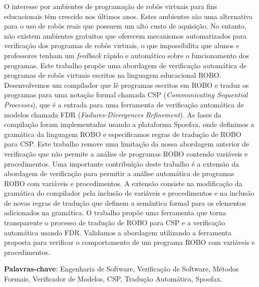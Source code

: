 \setlength{\absparsep}{18pt} %
\begin{resumo}
 
O interesse por ambientes de programação de robôs virtuais para fins educacionais têm crescido nos últimos anos. Estes ambientes são uma alternativa para o uso de robôs reais que possuem um alto custo de aquisição. No entanto, não existem ambientes gratuitos que oferecem  mecanismos automatizados para verificação dos programas de robôs virtuais, o que impossibilita que alunos e professores tenham um \textit{feedback} rápido e automático sobre o funcionamento dos programas. 
Este trabalho propõe uma abordagem de verificação automática de programas de robôs virtuais escritos na linguagem educacional ROBO. Desenvolvemos um compilador que lê programas escritos em ROBO e traduz os programas para uma notação formal chamada CSP (\textit{Communicating Sequential Processes}), que é a entrada para uma ferramenta de verificação automática de modelos chamada FDR (\textit{Failures-Divergences Refinement}). As fases da compilação foram implementadas usando a plataforma Spoofax, onde definimos a gramática da linguagem ROBO e especificamos regras de tradução de ROBO para CSP.  
Este trabalho remove uma limitação da nossa abordagem anterior de verificação que não permite a análise de programas ROBO contendo variáveis e procedimentos.
Uma importante contribuição deste trabalho é a extensão da abordagem de verificação para permitir a análise automática de programas ROBO com variáveis e procedimentos. 
A extensão consiste na modificação da gramática do compilador pela inclusão de variáveis e procedimentos e na inclusão de novas regras de tradução que definem a semântica formal para os elementos adicionados na gramática.
O trabalho propõe uma ferramenta que torna transparente o processo de tradução de ROBO para CSP e a verificação automática usando FDR. Validamos a abordagem utilizando a ferramenta proposta para verificar o comportamento de um programa ROBO com variáveis e procedimentos.



 \textbf{Palavras-chave}: Engenharia de Software, Verificação de Software, Métodos Formais, Verificador de Modelos, CSP, Tradução Automática, Spoofax.
\end{resumo}

